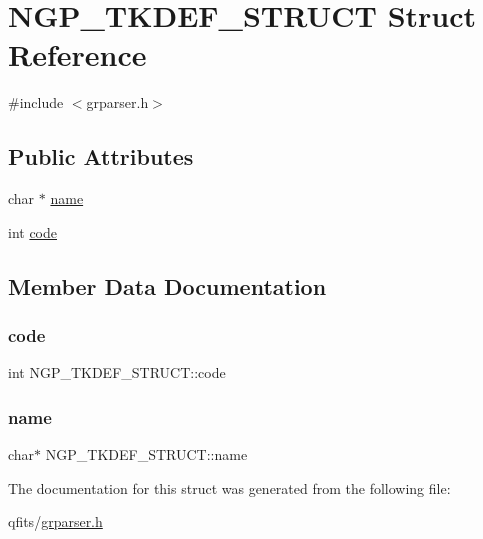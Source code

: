 \hypertarget{struct_n_g_p___t_k_d_e_f___s_t_r_u_c_t}{}\section{N\+G\+P\+\_\+\+T\+K\+D\+E\+F\+\_\+\+S\+T\+R\+U\+CT Struct Reference}
\label{struct_n_g_p___t_k_d_e_f___s_t_r_u_c_t}


{\ttfamily \#include $<$grparser.\+h$>$}

\subsection*{Public Attributes}
\begin{DoxyCompactItemize}
\item 
char $\ast$ \hyperlink{struct_n_g_p___t_k_d_e_f___s_t_r_u_c_t_a6f675e9c540242f520cb8ec048c7bb44}{name}
\item 
int \hyperlink{struct_n_g_p___t_k_d_e_f___s_t_r_u_c_t_a1b8f6353ebaf7699dbb6601bfec8524d}{code}
\end{DoxyCompactItemize}


\subsection{Member Data Documentation}
\mbox{\label{struct_n_g_p___t_k_d_e_f___s_t_r_u_c_t_a1b8f6353ebaf7699dbb6601bfec8524d}} 
\subsubsection{\texorpdfstring{code}{code}}
{\footnotesize\ttfamily int N\+G\+P\+\_\+\+T\+K\+D\+E\+F\+\_\+\+S\+T\+R\+U\+C\+T\+::code}

\mbox{\label{struct_n_g_p___t_k_d_e_f___s_t_r_u_c_t_a6f675e9c540242f520cb8ec048c7bb44}} 
\subsubsection{\texorpdfstring{name}{name}}
{\footnotesize\ttfamily char$\ast$ N\+G\+P\+\_\+\+T\+K\+D\+E\+F\+\_\+\+S\+T\+R\+U\+C\+T\+::name}



The documentation for this struct was generated from the following file\+:\begin{DoxyCompactItemize}
\item 
qfits/\hyperlink{grparser_8h}{grparser.\+h}\end{DoxyCompactItemize}
